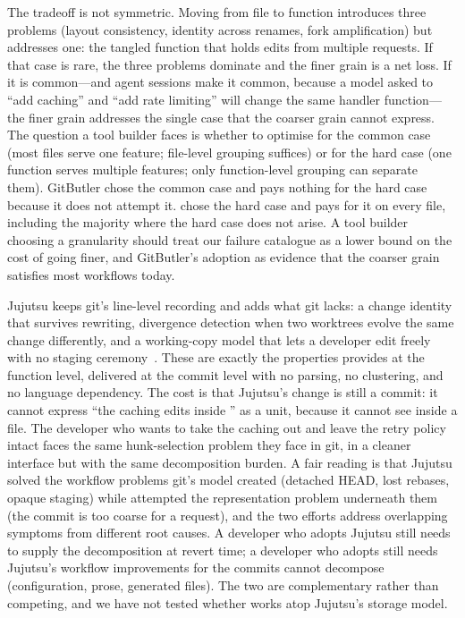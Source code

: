 The tradeoff is not symmetric. Moving from file to function introduces three
problems (layout consistency, identity across renames, fork amplification) but
addresses one: the tangled function that holds edits from multiple requests. If
that case is rare, the three problems dominate and the finer grain is a net loss.
If it is common---and agent sessions make it common, because a model asked to
``add caching'' and ``add rate limiting'' will change the same handler
function---the finer grain addresses the single case that the coarser grain
cannot express. The question a tool builder faces is whether to optimise for
the common case (most files serve one feature; file-level grouping suffices) or
for the hard case (one function serves multiple features; only function-level
grouping can separate them). GitButler chose the common case and pays nothing
for the hard case because it does not attempt it. \sgt{} chose the hard case and
pays for it on every file, including the majority where the hard case does not
arise. A tool builder choosing a granularity should treat our failure catalogue
as a lower bound on the cost of going finer, and GitButler's adoption as
evidence that the coarser grain satisfies most workflows today.

Jujutsu keeps git's line-level recording and adds what git lacks: a change
identity that survives rewriting, divergence detection when two worktrees evolve
the same change differently, and a working-copy model that lets a developer
edit freely with no staging ceremony~\cite{jujutsu2026}. These are exactly the
properties \sgt{} provides at the function level, delivered at the commit level
with no parsing, no clustering, and no language dependency. The cost is that
Jujutsu's change is still a commit: it cannot express ``the caching edits inside
'' as a unit, because it cannot see inside a file. The
developer who wants to take the caching out and leave the retry policy intact
faces the same hunk-selection problem they face in git, in a cleaner interface
but with the same decomposition burden. A fair reading is that Jujutsu solved the
workflow problems git's model created (detached HEAD, lost rebases, opaque
staging) while \sgt{} attempted the representation problem underneath them (the
commit is too coarse for a request), and the two efforts address overlapping
symptoms from different root causes. A developer who adopts Jujutsu still needs
to supply the decomposition at revert time; a developer who adopts \sgt{} still
needs Jujutsu's workflow improvements for the commits \sgt{} cannot decompose
(configuration, prose, generated files). The two are complementary rather than
competing, and we have not tested whether \sgt{} works atop Jujutsu's storage
model.

